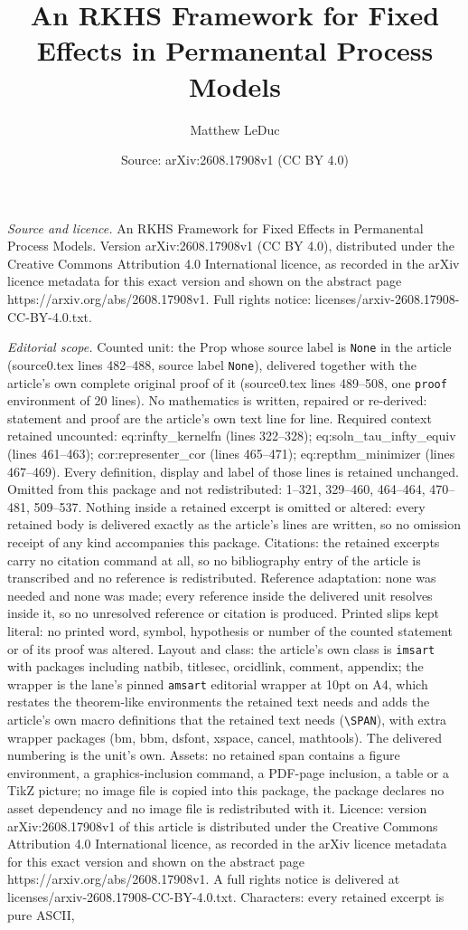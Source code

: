\documentclass[10pt,a4paper]{amsart}
\title[An RKHS Framework for Fixed Effects in Permanental Process M]{An RKHS Framework for Fixed Effects in Permanental Process Models}
\author{Matthew LeDuc}
\date{Source: arXiv:2608.17908v1 (CC BY 4.0)}
\begin{document}
\maketitle

\noindent\emph{Source and licence.} An RKHS Framework for Fixed Effects in Permanental Process Models. Version arXiv:2608.17908v1 (CC BY 4.0), distributed under the Creative Commons Attribution 4.0 International licence, as recorded in the arXiv licence metadata for this exact version and shown on the abstract page https://arxiv.org/abs/2608.17908v1. Full rights notice: licenses/arxiv-2608.17908-CC-BY-4.0.txt.\par\smallskip

\noindent\textit{Editorial scope.} Counted unit: the Prop whose source label is \texttt{None} in the article (source0.tex lines 482--488, source label \texttt{None}), delivered together with the article's own complete original proof of it (source0.tex lines 489--508, one \texttt{proof} environment of 20 lines). No mathematics is written, repaired or re-derived: statement and proof are the article's own text line for line. Required context retained uncounted: eq:rinfty\_kernelfn (lines 322--328); eq:soln\_tau\_infty\_equiv (lines 461--463); cor:representer\_cor (lines 465--471); eq:repthm\_minimizer (lines 467--469). Every definition, display and label of those lines is retained unchanged. Omitted from this package and not redistributed: 1--321, 329--460, 464--464, 470--481, 509--537. Nothing inside a retained excerpt is omitted or altered: every retained body is delivered exactly as the article's lines are written, so no omission receipt of any kind accompanies this package. Citations: the retained excerpts carry no citation command at all, so no bibliography entry of the article is transcribed and no reference is redistributed. Reference adaptation: none was needed and none was made; every reference inside the delivered unit resolves inside it, so no unresolved reference or citation is produced. Printed slips kept literal: no printed word, symbol, hypothesis or number of the counted statement or of its proof was altered. Layout and class: the article's own class is \texttt{imsart} with packages including natbib, titlesec, orcidlink, comment, appendix; the wrapper is the lane's pinned \texttt{amsart} editorial wrapper at 10pt on A4, which restates the theorem-like environments the retained text needs and adds the article's own macro definitions that the retained text needs (\texttt{\textbackslash SPAN}), with extra wrapper packages (bm, bbm, dsfont, xspace, cancel, mathtools). The delivered numbering is the unit's own. Assets: no retained span contains a figure environment, a graphics-inclusion command, a PDF-page inclusion, a table or a TikZ picture; no image file is copied into this package, the package declares no asset dependency and no image file is redistributed with it. Licence: version arXiv:2608.17908v1 of this article is distributed under the Creative Commons Attribution 4.0 International licence, as recorded in the arXiv licence metadata for this exact version and shown on the abstract page https://arxiv.org/abs/2608.17908v1. A full rights notice is delivered at licenses/arxiv-2608.17908-CC-BY-4.0.txt. Characters: every retained excerpt is pure ASCII, 
\end{document}
